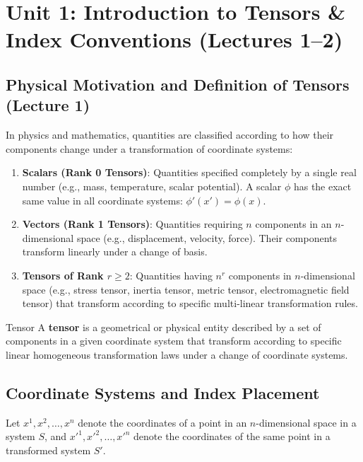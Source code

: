 \documentclass[11pt,a4paper]{article}
\begin{document}
\newpage
\tableofcontents
\newpage

\section{Unit 1: Introduction to Tensors \& Index Conventions (Lectures 1--2)}

\subsection{Physical Motivation and Definition of Tensors (Lecture 1)}

In physics and mathematics, quantities are classified according to how their components change under a transformation of coordinate systems:
\begin{enumerate}
    \item \textbf{Scalars (Rank 0 Tensors)}: Quantities specified completely by a single real number (e.g., mass, temperature, scalar potential). A scalar $\phi$ has the exact same value in all coordinate systems: $\phi'(x') = \phi(x)$.
    \item \textbf{Vectors (Rank 1 Tensors)}: Quantities requiring $n$ components in an $n$-dimensional space (e.g., displacement, velocity, force). Their components transform linearly under a change of basis.
    \item \textbf{Tensors of Rank $r \ge 2$}: Quantities having $n^r$ components in $n$-dimensional space (e.g., stress tensor, inertia tensor, metric tensor, electromagnetic field tensor) that transform according to specific multi-linear transformation rules.
\end{enumerate}

\begin{definitionbox}{Tensor}
A \textbf{tensor} is a geometrical or physical entity described by a set of components in a given coordinate system that transform according to specific linear homogeneous transformation laws under a change of coordinate systems.
\end{definitionbox}

\subsection{Coordinate Systems and Index Placement}
Let $x^1, x^2, \dots, x^n$ denote the coordinates of a point in an $n$-dimensional space in a system $S$, and $x'^1, x'^2, \dots, x'^n$ denote the coordinates of the same point in a transformed system $S'$.
\end{document}
